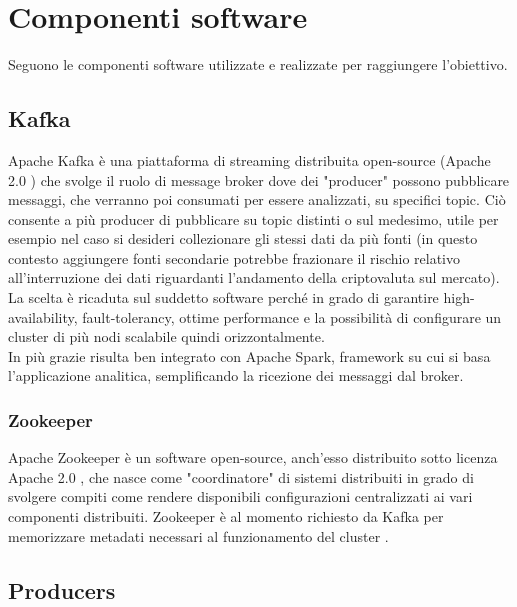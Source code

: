 \section{Componenti software}

Seguono le componenti software utilizzate e realizzate per raggiungere l'obiettivo.

\subsection{Kafka}

Apache Kafka è una piattaforma di streaming distribuita open-source
(Apache 2.0 \cite{apache2_license}) che svolge il ruolo di message broker
dove dei "producer" possono pubblicare messaggi, che verranno poi consumati per essere analizzati,
su specifici topic. Ciò consente a più producer di pubblicare su topic distinti o sul medesimo,
utile per esempio nel caso si desideri collezionare gli stessi dati da più fonti
(in questo contesto aggiungere fonti secondarie potrebbe frazionare il rischio relativo
all'interruzione dei dati riguardanti l'andamento della criptovaluta sul mercato).
\\
La scelta è ricaduta sul suddetto software perché in grado di garantire
high-availability, fault-tolerancy, ottime performance e la possibilità di configurare un cluster
di più nodi scalabile quindi orizzontalmente. \cite{kafka_doc}
\\
In più grazie risulta ben integrato con Apache Spark, framework su cui si basa l'applicazione
analitica, semplificando la ricezione dei messaggi dal broker.


\subsubsection{Zookeeper}

Apache Zookeeper è un software open-source, anch'esso distribuito sotto licenza
Apache 2.0 \cite{apache2_license}, che nasce come "coordinatore" di sistemi distribuiti
in grado di svolgere compiti come rendere disponibili configurazioni centralizzati ai vari
componenti distribuiti. Zookeeper è al momento richiesto da Kafka per memorizzare metadati
necessari al funzionamento del cluster \cite{kafka_zookeeper}.

\subsection{Producers}

